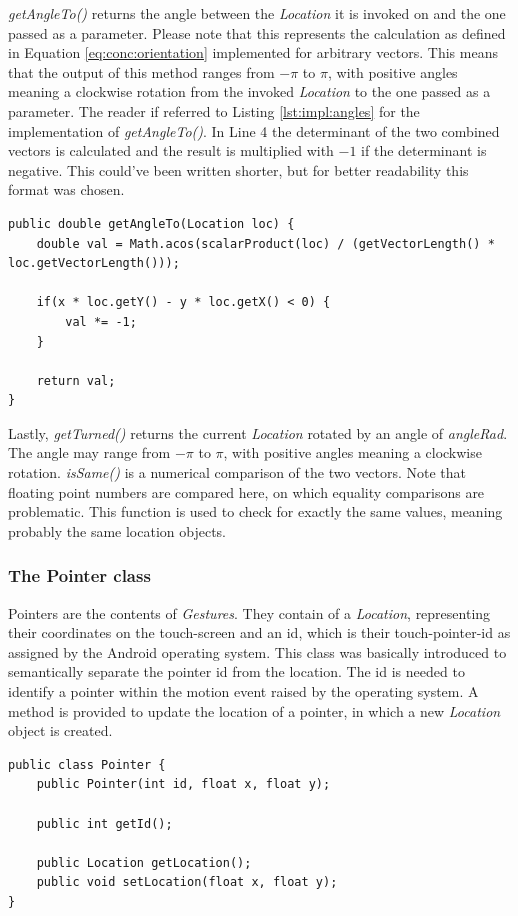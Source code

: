 \textit{getAngleTo()} returns the angle between the \textit{Location} it is invoked on and the one passed as a parameter. Please note that this represents the calculation as defined in Equation \ref{eq:conc:orientation} implemented for arbitrary vectors. This means that the output of this method ranges from $-\pi$ to $\pi$, with positive angles meaning a clockwise rotation from the invoked \textit{Location} to the one passed as a parameter. The reader if referred to Listing \ref{lst:impl:angles} for the implementation of \textit{getAngleTo()}. In Line 4 the determinant of the two combined vectors is calculated and the result is multiplied with $-1$ if the determinant is negative. This could've been written shorter, but for better readability this format was chosen.

\begin{lstlisting}[caption={Implementation of getAngleTo()},label=lst:impl:angles]
public double getAngleTo(Location loc) {
	double val = Math.acos(scalarProduct(loc) / (getVectorLength() * loc.getVectorLength()));
	
	if(x * loc.getY() - y * loc.getX() < 0) {
		val *= -1;
	}

	return val;
}
\end{lstlisting}

Lastly, \textit{getTurned()} returns the current \textit{Location} rotated by an angle of \textit{angleRad}. The angle may range from $-\pi$ to $\pi$, with positive angles meaning a clockwise rotation. \textit{isSame()} is a numerical comparison of the two vectors. Note that floating point numbers are compared here, on which equality comparisons are problematic. This function is used to check for exactly the same values, meaning probably the same location objects.

\subsubsection{The Pointer class}

Pointers are the contents of \textit{Gestures}. They contain of a \textit{Location}, representing their coordinates on the touch-screen and an id, which is their touch-pointer-id as assigned by the Android operating system. This class was basically introduced to semantically separate the pointer id from the location. The id is needed to identify a pointer within the motion event raised by the operating system. A method is provided to update the location of a pointer, in which a new \textit{Location} object is created.
\begin{lstlisting}[caption={The Pointer class}]
public class Pointer {
	public Pointer(int id, float x, float y);

	public int getId();

	public Location getLocation();
	public void setLocation(float x, float y);
}
\end{lstlisting}

